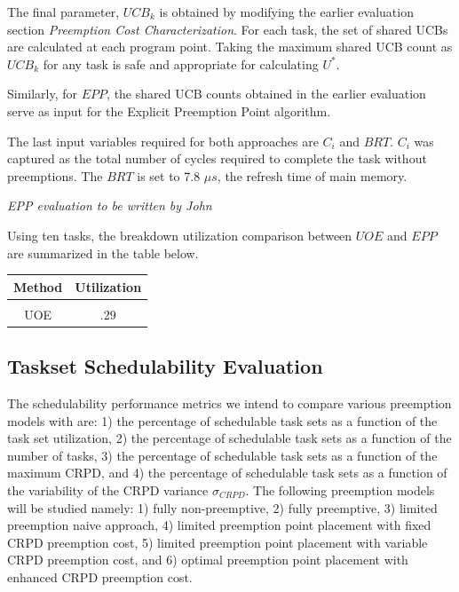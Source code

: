 The final parameter, ${UCB_k}$ is obtained by modifying the earlier
evaluation section \emph{Preemption Cost Characterization}. For each
task, the set of shared UCBs are calculated at each program
point. Taking the maximum shared UCB count as ${UCB_k}$ for any task
is safe and appropriate for calculating ${U^*}$.

Similarly, for ${EPP}$, the shared UCB counts obtained in the earlier
evaluation serve as input for the Explicit Preemption Point
algorithm. 

The last input variables required for both approaches are ${C_i}$ and
${BRT}$. ${C_i}$ was captured as the total number of cycles required
to complete the task without preemptions. The ${BRT}$ is set to 7.8
${{\mu}s}$, the refresh time of main memory.

\emph{EPP evaluation to be written by John}

Using ten tasks, the breakdown utilization comparison between ${UOE}$
and ${EPP}$ are summarized in the table below.


\begin{minipage}{\linewidth}
  \bigskip
  \centering
    \begin{tabular}{c | c}
      Method & Utilization \\
      \hline
      \\
      UOE & .29 \\
    \end{tabular}
\end{minipage}


\subsection {Taskset Schedulability Evaluation}\label{sec:taskset schedulability}
The schedulability performance metrics we intend to compare various
preemption models with are: 1) the percentage of schedulable task sets
as a function of the task set utilization, 2) the percentage of
schedulable task sets as a function of the number of tasks, 3) the
percentage of schedulable task sets as a function of the maximum CRPD,
and 4) the percentage of schedulable task sets as a function of the
variability of the CRPD variance \begin{math}\sigma_{CRPD}\end{math}.
The following preemption models will be studied namely: 1) fully
non-preemptive, 2) fully preemptive, 3) limited preemption naive
approach, 4) limited preemption point placement with fixed CRPD
preemption cost, 5) limited preemption point placement with variable
CRPD preemption cost, and 6) optimal preemption point placement with
enhanced CRPD preemption cost. 

